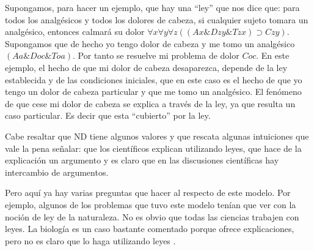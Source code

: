 
Supongamos, para hacer un ejemplo, que hay una ``ley'' que nos dice que: para todos los analgésicos y todos los dolores de cabeza, si cualquier sujeto tomara un analgésico, entonces calmará su dolor $\forall{x}\forall{y}\forall{z}((Ax\&Dzy\&Tzx)\supset Czy)$. Supongamos que de hecho yo tengo dolor de cabeza y me tomo un analgésico $(Aa \& Doc \& Toa)$. Por tanto se resuelve mi problema de dolor $Coc$. En este ejemplo, el hecho de que mi dolor de cabeza desaparezca, depende de la ley establecida y de las condiciones iniciales, que en este caso es el hecho de que yo tengo un dolor de cabeza particular y que me tomo un analgésico. El fenómeno de que cese mi dolor de cabeza se explica a través de la ley, ya que resulta un caso particular. Es decir que esta ``cubierto'' por la ley.

Cabe resaltar que ND tiene algunos valores y que rescata algunas intuiciones que vale la pena señalar: que los científicos explican utilizando leyes, que hace de la explicación un argumento y es claro que en las discusiones científicas hay intercambio de argumentos.

Pero aquí ya hay varias preguntas que hacer al respecto de este modelo. Por ejemplo, algunos de los problemas que tuvo este modelo tenían que ver con la noción de ley de la naturaleza. No es obvio que todas las ciencias trabajen con leyes. La biología es un caso bastante comentado porque ofrece explicaciones, pero no es claro que lo haga utilizando leyes \cite{Brandon1997}.

